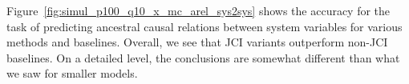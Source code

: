 \documentclass[twoside,11pt]{article}
\newcommand{\boldcap}[1]{\textbf{#1}}
\begin{document}
\begin{comment}
\begin{figure}[t]
\centerline{%
\texttt{[image: \{linear\_stochastic\_100\_10\_0.02\_0.02\_100\_1\_0\_ROC\_sys2sys\_arel\_fci]}.png}
\texttt{[image: \{linear\_stochastic\_100\_10\_0.02\_0.02\_100\_1\_0\_PR1\_sys2sys\_arel\_fci\_zoom]}.png}
\texttt{[image: \{linear\_stochastic\_100\_10\_0.02\_0.02\_100\_1\_0\_PR0\_sys2sys\_arel\_fci\_zoom]}.png}
\texttt{[image: \{linear\_stochastic\_100\_10\_0.02\_0.02\_100\_1\_0\_LEG\_sys2sys\_arel\_fci]}.png}
}
\centerline{%
\texttt{[image: \{linear\_stochastic\_100\_10\_0.02\_0.02\_100\_1\_0\_ROC\_sys2sys\_arel\_lcdicp-bs]}.png}
\texttt{[image: \{linear\_stochastic\_100\_10\_0.02\_0.02\_100\_1\_0\_PR1\_sys2sys\_arel\_lcdicp-bs\_zoom]}.png}
\texttt{[image: \{linear\_stochastic\_100\_10\_0.02\_0.02\_100\_1\_0\_PR0\_sys2sys\_arel\_lcdicp-bs]}.png}
\texttt{[image: \{linear\_stochastic\_100\_10\_0.02\_0.02\_100\_1\_0\_LEG\_sys2sys\_arel\_lcdicp-bs]}.png}
}
\caption{\boldcap{Results for discovering ancestral causal relations between system variables} in large models WITH STANDARD TEST. Top: FCI variants; %
 Bottom: Bootstrapped LCD and ICP variants. Note that we zoomed in on the PR curves.\label{fig:simul_p100_q10_x_mc_arel_sys2sys}}
\end{figure}
\end{comment}

Figure~\ref{fig:simul_p100_q10_x_mc_arel_sys2sys} shows the accuracy for the task of predicting ancestral causal relations between system variables for various methods and baselines. 
Overall, we see that JCI variants outperform non-JCI baselines.
On a detailed level, the conclusions are somewhat different than what we saw for smaller models. 
\end{document}
